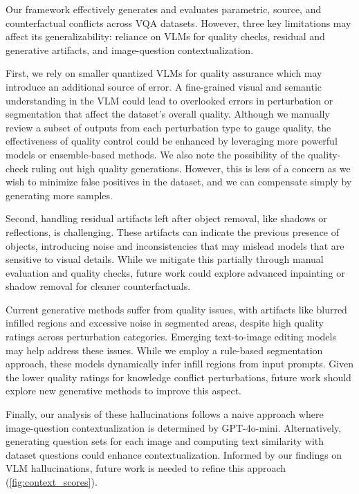 Our framework effectively generates and evaluates parametric, source, and counterfactual conflicts across VQA datasets. However, three key limitations may affect its generalizability: reliance on VLMs for quality checks, residual and generative artifacts, and image-question contextualization.

First, we rely on smaller quantized VLMs for quality assurance which may introduce an additional source of error. A fine-grained visual and semantic understanding in the VLM could lead to overlooked errors in perturbation or segmentation that affect the dataset’s overall quality. Although we manually review a subset of outputs from each perturbation type to gauge quality, the effectiveness of quality control could be enhanced by leveraging more powerful models or ensemble-based methods. We also note the possibility of the quality-check ruling out high quality generations. However, this is less of a concern as we wish to minimize false positives in the dataset, and we can compensate simply by generating more samples.

Second, handling residual artifacts left after object removal, like shadows or reflections, is challenging. These artifacts can indicate the previous presence of objects, introducing noise and inconsistencies that may mislead models that are sensitive to visual details. While we mitigate this partially through manual evaluation and quality checks, future work could explore advanced inpainting or shadow removal for cleaner counterfactuals.

Current generative methods suffer from quality issues, with artifacts like blurred infilled regions and excessive noise in segmented areas, despite high quality ratings across perturbation categories. Emerging text-to-image editing models \citep{hui_hq-edit_2024,bodur_iedit_2023,zhang_magicbrush_2024} may help address these issues. While we employ a rule-based segmentation approach, these models dynamically infer infill regions from input prompts. Given the lower quality ratings for knowledge conflict perturbations, future work should explore new generative methods to improve this aspect.

Finally, our analysis of these hallucinations follows a naive approach where image-question contextualization is determined by GPT-4o-mini. Alternatively, generating question sets for each image and computing text similarity with dataset questions could enhance contextualization. Informed by our findings on VLM hallucinations, future work is needed to refine this approach (\autoref{fig:context_scores}). 


